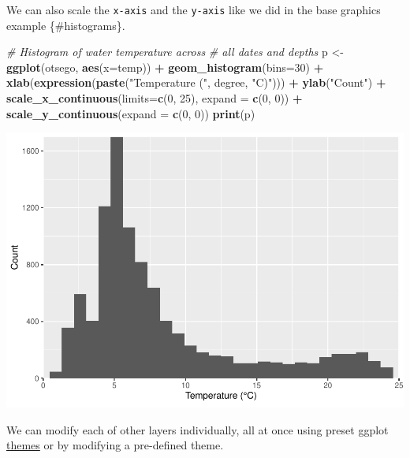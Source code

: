\documentclass[
]{book}
\newenvironment{Shaded}{\begin{snugshade}}{\end{snugshade}}
\newcommand{\CommentTok}[1]{\textcolor[rgb]{0.56,0.35,0.01}{\textit{#1}}}
\newcommand{\DataTypeTok}[1]{\textcolor[rgb]{0.13,0.29,0.53}{#1}}
\newcommand{\DecValTok}[1]{\textcolor[rgb]{0.00,0.00,0.81}{#1}}
\newcommand{\KeywordTok}[1]{\textcolor[rgb]{0.13,0.29,0.53}{\textbf{#1}}}
\newcommand{\NormalTok}[1]{#1}
\newcommand{\OperatorTok}[1]{\textcolor[rgb]{0.81,0.36,0.00}{\textbf{#1}}}
\newcommand{\StringTok}[1]{\textcolor[rgb]{0.31,0.60,0.02}{#1}}
\begin{document}
We can also scale the \texttt{x-axis} and the \texttt{y-axis} like we did in the base graphics example \{\#histograms\}.

\begin{Shaded}
\begin{Highlighting}[]
\CommentTok{# Histogram of water temperature across }
\CommentTok{# all dates and depths}
\NormalTok{p <-}\StringTok{ }\KeywordTok{ggplot}\NormalTok{(otsego, }\KeywordTok{aes}\NormalTok{(}\DataTypeTok{x=}\NormalTok{temp)) }\OperatorTok{+}\StringTok{ }
\StringTok{  }\KeywordTok{geom_histogram}\NormalTok{(}\DataTypeTok{bins=}\DecValTok{30}\NormalTok{) }\OperatorTok{+}\StringTok{ }
\StringTok{  }\KeywordTok{xlab}\NormalTok{(}\KeywordTok{expression}\NormalTok{(}\KeywordTok{paste}\NormalTok{(}\StringTok{"Temperature ("}\NormalTok{, degree, }\StringTok{"C)"}\NormalTok{))) }\OperatorTok{+}
\StringTok{  }\KeywordTok{ylab}\NormalTok{(}\StringTok{"Count"}\NormalTok{) }\OperatorTok{+}
\StringTok{  }\KeywordTok{scale_x_continuous}\NormalTok{(}\DataTypeTok{limits=}\KeywordTok{c}\NormalTok{(}\DecValTok{0}\NormalTok{, }\DecValTok{25}\NormalTok{), }\DataTypeTok{expand =} \KeywordTok{c}\NormalTok{(}\DecValTok{0}\NormalTok{, }\DecValTok{0}\NormalTok{)) }\OperatorTok{+}\StringTok{ }
\StringTok{  }\KeywordTok{scale_y_continuous}\NormalTok{(}\DataTypeTok{expand =} \KeywordTok{c}\NormalTok{(}\DecValTok{0}\NormalTok{, }\DecValTok{0}\NormalTok{))}
\KeywordTok{print}\NormalTok{(p)}
\end{Highlighting}
\end{Shaded}

\includegraphics{worstr_files/figure-latex/unnamed-chunk-101-1.pdf}

We can modify each of other layers individually, all at once using preset ggplot \href{http://www.sthda.com/english/wiki/ggplot2-title-main-axis-and-legend-titles}{themes} or by modifying a pre-defined theme.
\end{document}
